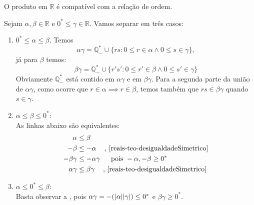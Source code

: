 \documentclass[../main.tex]{subfiles}
\begin{document}
\begin{teo}\label{reais-teo-multCompativelOrdem}
    O produto em $\mathbb{R}$ é compatível com a relação de ordem.
\end{teo}
\begin{dem}
    Sejam $\alpha, \beta \in \mathbb{R}$ e $0^* \leq \gamma \in \mathbb{R}$. Vamos separar em três casos:
    \begin{enumerate}
        \item $0^* \leq \alpha \leq \beta$.
            Temos \[ \alpha\gamma = \mathbb{Q}_{-}^* \cup \{ rs : 0 \leq r \in \alpha \land 0 \leq s \in \gamma \} , \]
            já para $\beta$ temos:
            \[ \beta\gamma = \mathbb{Q}_{-}^* \cup \{ r's' : 0 \leq r' \in \beta \land 0 \leq s' \in \gamma \} \]
            Obviamente $\mathbb{Q}_{-}^* $ está contido em $\alpha\gamma$ e em $\beta\gamma$. Para a segunda parte da união de $\alpha\gamma$, como ocorre que $r \in \alpha \implies r \in \beta$, temos também que $rs \in \beta\gamma$ quando $s \in \gamma$.

        \item $\alpha \leq \beta \leq 0^*$: \\
            As linhas abaixo são equivalentes:
            \begin{align*}
                \alpha &\leq \beta \\
                -\beta &\leq -\alpha \littleSpace  \text{, \Cref{reais-teo-desigualdadeSimetrico}} \\
                -\beta\gamma &\leq -\alpha\gamma \littleSpace \text{ pois } -\alpha, -\beta \geq 0^* \\
                \alpha\gamma &\leq \beta\gamma \littleSpace \text{, \Cref{reais-teo-desigualdadeSimetrico}} 
            \end{align*}

        \item $\alpha \leq 0^* \leq \beta$: \\
            Basta observar a , pois $\alpha\gamma = -(\abs{\alpha}\abs{\gamma}) \leq 0^*$ e $\beta\gamma \geq 0^*$.
    \end{enumerate}
\end{dem}
\end{document}
